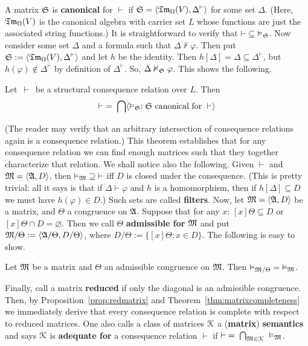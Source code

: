 A matrix $\mathfrak{S}$ is \textbf{canonical} for $\vdash$ if 
$\mathfrak{S} = \langle\mathfrak{Tm}_{\Omega}(V), \Delta^{\vdash}\rangle$ for some set
$\Delta$. (Here, $\mathfrak{Tm}_{\Omega}(V)$ is the canonical algebra
with carrier set $L$ whose functions are just the associated string
functions.) It is straightforward to verify that
$\vdash\; \subseteq\; \vDash_{\mathfrak{S}}$. Now consider some set $\Delta$
and a formula such that $\Delta \nvdash \varphi$. Then put $\mathfrak{S} :=
\langle\mathfrak{Tm}_{\Omega}(V), \Delta^{\vdash}\rangle$ and let $h$
be the identity. Then $h[\Delta] = \Delta \subseteq \Delta^{\vdash}$,
but $h(\varphi) \not\in \Delta^{\vdash}$ by definition of
$\Delta^{\vdash}$. So, $\Delta \nvDash_{\mathfrak{S}} \varphi$. This
shows the following.
\begin{thm}
\label{thm:matrixcompleteness}
Let $\,\vdash\,$ be a structural consequence relation over $L$. Then
\begin{equation}
\vdash\; = \;\bigcap \langle \vDash_{\mathfrak{S}} : \mathfrak{S} \mbox{ canonical for }
\vdash\rangle
\end{equation}
\end{thm}
(The reader may verify that an arbitrary intersection of consequence
relations again is a consequence relation.) This theorem establishes
that for any consequence relation we can find enough matrices such
that they together characterize that relation. We shall notice also
the following. Given $\vdash$ and $\mathfrak{M} = \langle \mathfrak{A}, D\rangle$, then
$\vDash_{\mathfrak{M}}\; \supseteq\; \vdash$ iff $D$ is closed under
the consequence. (This is pretty trivial: all it says is that if
$\Delta \vdash \varphi$ and $h$ is a homomorphism, then if
$h[\Delta] \subseteq D$ we must have $h(\varphi) \in D$.) Such sets are
called \textbf{filters}. Now, let $\mathfrak{M} = \langle \mathfrak{A}, D\rangle$ be a matrix,
and $\Theta$ a congruence on $\mathfrak{A}$. Suppose that for any $x$:
$[x]\Theta \subseteq D$ or $[x]\Theta \cap D = \varnothing$.
Then we call $\Theta$ 
\textbf{admissible for} $\mathfrak{M}$ and put $\mathfrak{M}/\Theta := \langle \mathfrak{A}/\Theta, 
D/\Theta\rangle$, where $D/\Theta := \{[x]\Theta
: x \in D\}$. The following is easy to show.
\begin{prop}
\label{prop:redmatrix}
Let $\mathfrak{M}$ be a matrix and $\Theta$ an admissible congruence on $\mathfrak{M}$.
Then $\vDash_{\mathfrak{M}/\Theta}\; = \;\vDash_{\mathfrak{M}}$.
\end{prop}
Finally, call a matrix \textbf{reduced} if only the diagonal is an
admissible congruence. Then, by Proposition~\ref{prop:redmatrix}
and Theorem~\ref{thm:matrixcompleteness} we immediately derive that
every consequence relation is complete with respect to reduced
matrices. One also calls a class of matrices $\mathcal{K}$ a (\textbf{matrix})
\textbf{semantics} and says $\mathcal{K}$ is \textbf{adequate for} a consequence
relation $\vdash$ if $\vdash\; =\; \bigcap_{\mathfrak{M} \in \mathcal{K}} \; \vDash_{\mathfrak{M}}$.

